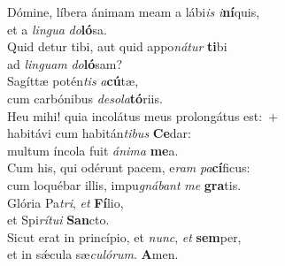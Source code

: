 \evenverse Dómine, líbera ánimam meam a lábi\textit{is} \textit{i}\textbf{ní}quis,~\*\\
\evenverse et a \textit{lin}\textit{gua} \textit{do}\textbf{ló}sa.\\
\oddverse Quid detur tibi, aut quid appo\textit{ná}\textit{tur} \textbf{ti}bi~\*\\
\oddverse ad \textit{lin}\textit{guam} \textit{do}\textbf{ló}sam?\\
\evenverse Sagíttæ potén\textit{tis} \textit{a}\textbf{cú}tæ,~\*\\
\evenverse cum carbónibus \textit{de}\textit{so}\textit{la}\textbf{tó}riis.\\
\oddverse Heu mihi! quia incolátus meus prolongátus est:~+\\
\oddverse  habitávi cum habitán\textit{ti}\textit{bus} \textbf{Ce}dar:~\*\\
\oddverse multum íncola fuit \textit{á}\textit{ni}\textit{ma} \textbf{me}a.\\
\evenverse Cum his, qui odérunt pacem, e\textit{ram} \textit{pa}\textbf{cí}ficus:~\*\\
\evenverse cum loquébar illis, impu\textit{gná}\textit{bant} \textit{me} \textbf{gra}tis.\\
\oddverse Glória Pa\textit{tri}, \textit{et} \textbf{Fí}lio,~\*\\
\oddverse et Spi\textit{rí}\textit{tu}\textit{i} \textbf{San}cto.\\
\evenverse Sicut erat in princípio, et \textit{nunc}, \textit{et} \textbf{sem}per,~\*\\
\evenverse et in sǽcula sæ\textit{cu}\textit{ló}\textit{rum}. \textbf{A}men.\\
